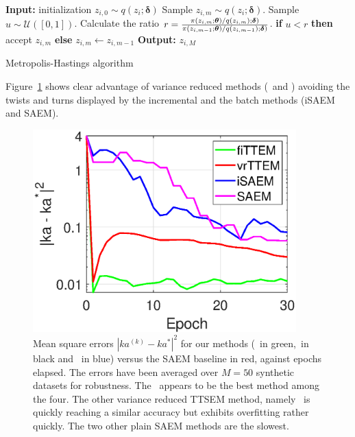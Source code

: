 \documentclass[12pt]{article}
\begin{document}
\begin{algorithm}[H]
\begin{algorithmic}[1]
\STATE \textbf{Input:} initialization $z_{i,0} \sim q(z_{i}; {\bm \delta})$
\STATE Sample $z_{i,m} \sim q(z_{i}; {\bm \delta})$.
\STATE Sample $u \sim \mathcal{U}([0, 1])$.
\STATE Calculate the ratio $r = \frac{\pi(z_{i,m}; {\bm{\theta}})/q(z_{i,m}); {\bm \delta})}{\pi(z_{i,m-1}; {\bm{\theta}})/q(z_{i,m-1}); {\bm \delta})}$.
\STATE \textbf{if} $u < r$ \textbf{then} accept $z_{i,m}$ \textbf{else} $z_{i,m} \leftarrow z_{i,m-1}$
\ENDFOR
\STATE \textbf{Output:} $z_{i,M}$
\end{algorithmic}
\caption{Metropolis-Hastings algorithm}
\label{alg:mh}
        \end{algorithm}


Figure~\ref{fig:pk_tts} shows clear advantage of variance reduced methods (\SAEMVR\ and \FISAEM ) avoiding the twists and turns displayed by the incremental and the batch methods (iSAEM and SAEM).

\begin{figure}[t]
\centering
\includegraphics[width=4in]{fig2/figpk.eps}
\caption{Mean square errors $|ka^{(k)} - ka^*|^2$ for our methods (\FISAEM\ in green,\SAEMVR\ in black and \ISAEM\ in blue) versus the SAEM baseline in red, against epochs elapsed. The errors have been averaged over $M=50$ synthetic datasets for robustness. The \FISAEM\ appears to be the best method among the four. The other variance reduced TTSEM method, namely \SAEMVR\, is quickly reaching a similar accuracy but exhibits overfitting rather quickly. The two other plain SAEM methods are the slowest.}
\label{fig:pk_tts}
\end{figure}
\end{document}
